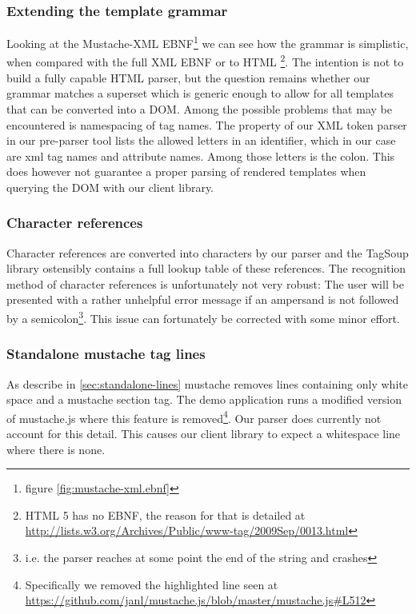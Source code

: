 \documentclass[thesis.tex]{subfiles}
\begin{document}
\subsubsection{Extending the template grammar}
Looking at the Mustache-XML EBNF\footnote{figure \ref{fig:mustache-xml.ebnf}} we
can see how the grammar is simplistic, when compared with the
full XML \cite[section 2/\#sec-documents]{XMLSPEC} EBNF or to
HTML \cite{HTMLSPEC}\footnote{
	HTML 5 has no EBNF, the reason for that is detailed at
	\url{http://lists.w3.org/Archives/Public/www-tag/2009Sep/0013.html}
}. The intention is not to build a fully capable HTML parser, but the question
remains whether our grammar matches a superset which is generic enough to allow
for all templates that can be converted into a DOM. Among the possible problems
that may be encountered is namespacing of tag names. The 
\cite[\#v:identLetter]{PARSECDOC} property of our XML token parser in our
pre-parser tool lists the allowed letters in an identifier,
which in our case are xml tag names and attribute names. Among those letters is
the colon. This does however not guarantee a proper parsing of rendered
templates when querying the DOM with our client library.

\subsubsection{Character references}
Character references are converted into characters by our parser and the
TagSoup library ostensibly contains a full lookup table of these references.
The recognition method of character references is unfortunately not very robust:
The user will be presented with a rather unhelpful error message if an ampersand
is not followed by a semicolon\footnote{
	i.e. the parser reaches at some point the end of the string and crashes
}. This issue can fortunately be corrected with some minor effort.

\subsubsection{Standalone mustache tag lines}
As describe in \ref{sec:standalone-lines} mustache removes
lines containing only white space and a mustache section tag.
The demo application runs a modified version of mustache.js where this feature
is removed\footnote{
	Specifically we removed the highlighted line seen at
	\url{https://github.com/janl/mustache.js/blob/master/mustache.js\#L512}
}. Our parser does currently not account for this detail. This causes
our client library to expect a whitespace line where there is none.
\end{document}
